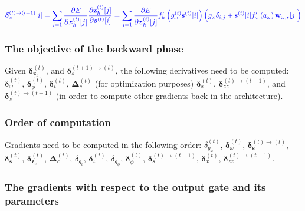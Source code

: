 \documentclass[11pt]{article}
\begin{document}
\begin{equation}
   {\color{blue}\boldsymbol{\delta}_s^{(t)\rightarrow(t+1)}[i] =
  \displaystyle\sum_{j=1}
      \dfrac{\partial E}{\partial \boldsymbol{z}_h^{(t)}[j]}
      \dfrac{\partial \mathbf{z}_h^{(t)}[j]}{\partial
        \boldsymbol{s}^{(t)}[i]}
      = \displaystyle\sum_{j=1}
      \dfrac{\partial E}{\partial \boldsymbol{z}_h^{(t)}[j]}
      f_{h}'\left(g_{\omega}^{(t)}\mathbf{s}^{(t)}[i]\right)
      \left( g_{\omega} \delta_{i,j} + \mathbf{s}^{(t)}[i]f'_{\omega}\left(a_{\omega}\right)\mathbf{w}_{\omega,s}[j] \right)}
\end{equation}


\subsubsection*{The objective of the backward phase}

Given $\boldsymbol{\delta}_{\mathbf{z}_h}^{(t)}$, and
$\boldsymbol{\delta}^{(t+1) \rightarrow (t)}_s$, the following
derivatives need to be computed: $\boldsymbol{\delta}_{\omega}^{(t)}$,
$\boldsymbol{\delta}_{\phi}^{(t)}$,
$\boldsymbol{\delta}_{\iota}^{(t)}$, $\boldsymbol{\Delta}_{c}^{(t)}$
(for optimization purposes) $\boldsymbol{\delta}_x^{(t)}$,
$\boldsymbol{\delta}_{zz}^{(t)\rightarrow(t-1)}$, and
$\boldsymbol{\delta}^{(t) \rightarrow (t-1)}_s$ (in order to compute
other gradients back in the architecture).

\subsubsection*{Order of computation}
Gradients need to be computed in the following order:
$\delta_{g_{\omega}}^{(t)}$, $\boldsymbol{\delta}_{\omega}^{(t)}$,
$\boldsymbol{\delta}_\mathbf{s}^{(t) \rightarrow (t)}$, $\boldsymbol{\delta}_{\mathbf{s}}^{(t)}$, $\boldsymbol{\delta}_{\mathbf{z}_c}^{(t)}$,
$\boldsymbol{\Delta}_{c}^{(t)}$, $\delta_{g_{\iota}}$,
$\boldsymbol{\delta}_{\iota}^{(t)}$, $\delta_{g_{\phi}}$,
$\boldsymbol{\delta}_{\phi}^{(t)}$,
$\boldsymbol{\delta}_s^{(t) \rightarrow (t-1)}$, $\boldsymbol{\delta}_x^{(t)}$,
$\boldsymbol{\delta}_{zz}^{(t)\rightarrow(t-1)}$.

\subsubsection*{The gradients with respect to the output gate and its parameters}
\end{document}
